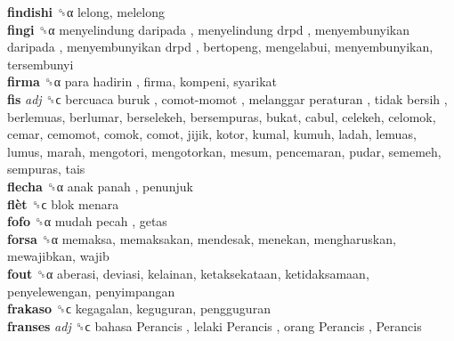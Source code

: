 \textbf{findishi} ␝α  lelong, melelong  \\
\textbf{fingi} ␝α   menyelindung daripada ,  menyelindung drpd ,  menyembunyikan daripada ,  menyembunyikan drpd , bertopeng, mengelabui, menyembunyikan, tersembunyi  \\
\textbf{firma} ␝α   para hadirin , firma, kompeni, syarikat  \\
\textbf{fis} \emph{adj}  ␝ϲ   bercuaca buruk ,  comot-momot ,  melanggar peraturan ,  tidak bersih , berlemuas, berlumar, berselekeh, bersempuras, bukat, cabul, celekeh, celomok, cemar, cemomot, comok, comot, jijik, kotor, kumal, kumuh, ladah, lemuas, lumus, marah, mengotori, mengotorkan, mesum, pencemaran, pudar, sememeh, sempuras, tais  \\
\textbf{flecha} ␝α   anak panah , penunjuk  \\
\textbf{flèt} ␝ϲ   blok menara   \\
\textbf{fofo} ␝α   mudah pecah , getas  \\
\textbf{forsa} ␝α  memaksa, memaksakan, mendesak, menekan, mengharuskan, mewajibkan, wajib  \\
\textbf{fout} ␝α  aberasi, deviasi, kelainan, ketaksekataan, ketidaksamaan, penyelewengan, penyimpangan  \\
\textbf{frakaso} ␝ϲ  kegagalan, keguguran, pengguguran  \\
\textbf{franses} \emph{adj}  ␝ϲ   bahasa Perancis ,  lelaki Perancis ,  orang Perancis ,  Perancis   \\
